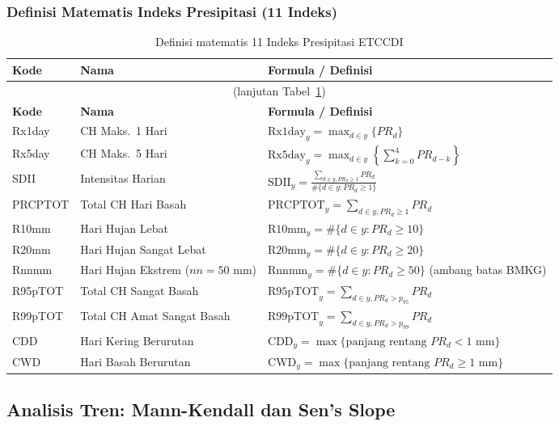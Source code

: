 \documentclass[12pt, a4paper]{article}
\begin{document}
\subsubsection{Definisi Matematis Indeks Presipitasi (11 Indeks)}

\begin{longtable}[l]{@{}p{1.8cm}p{4.2cm}p{7.4cm}@{}}
  \caption{Definisi matematis 11 Indeks Presipitasi ETCCDI}\label{tab:def_prec}\\
  \toprule
  \textbf{Kode} & \textbf{Nama} & \textbf{Formula / Definisi} \\
  \midrule
  \endfirsthead
  \multicolumn{3}{c}{\footnotesize(lanjutan Tabel~\ref{tab:def_prec})}\\
  \toprule
  \textbf{Kode} & \textbf{Nama} & \textbf{Formula / Definisi} \\
  \midrule
  \endhead
  \bottomrule
  \endfoot
  Rx1day  & CH Maks.\ 1 Hari & $\text{Rx1day}_y = \max_{d \in y}\{PR_d\}$ \\[3pt]
  Rx5day  & CH Maks.\ 5 Hari & $\text{Rx5day}_y = \max_{d \in y}\left\{\sum_{k=0}^{4} PR_{d-k}\right\}$ \\[3pt]
  SDII    & Intensitas Harian & $\text{SDII}_y = \frac{\sum_{d \in y, PR_d \geq 1} PR_d}{\#\{d \in y : PR_d \geq 1\}}$ \\[3pt]
  PRCPTOT & Total CH Hari Basah & $\text{PRCPTOT}_y = \sum_{d \in y, PR_d \geq 1} PR_d$ \\[3pt]
  R10mm   & Hari Hujan Lebat & $\text{R10mm}_y = \#\{d \in y : PR_d \geq 10\}$ \\[3pt]
  R20mm   & Hari Hujan Sangat Lebat & $\text{R20mm}_y = \#\{d \in y : PR_d \geq 20\}$ \\[3pt]
  Rnnmm   & Hari Hujan Ekstrem ($nn=50$ mm) & $\text{Rnnmm}_y = \#\{d \in y : PR_d \geq 50\}$ (ambang batas BMKG) \\[3pt]
  R95pTOT & Total CH Sangat Basah & $\text{R95pTOT}_y = \sum_{d \in y, PR_d > p_{95}} PR_d$ \\[3pt]
  R99pTOT & Total CH Amat Sangat Basah & $\text{R99pTOT}_y = \sum_{d \in y, PR_d > p_{99}} PR_d$ \\[3pt]
  CDD     & Hari Kering Berurutan & $\text{CDD}_y = \max\{\text{panjang rentang } PR_d < 1 \text{ mm}\}$ \\[3pt]
  CWD     & Hari Basah Berurutan  & $\text{CWD}_y = \max\{\text{panjang rentang } PR_d \geq 1 \text{ mm}\}$ \\
\end{longtable}

\subsection{Analisis Tren: Mann-Kendall dan Sen's Slope}
\end{document}
